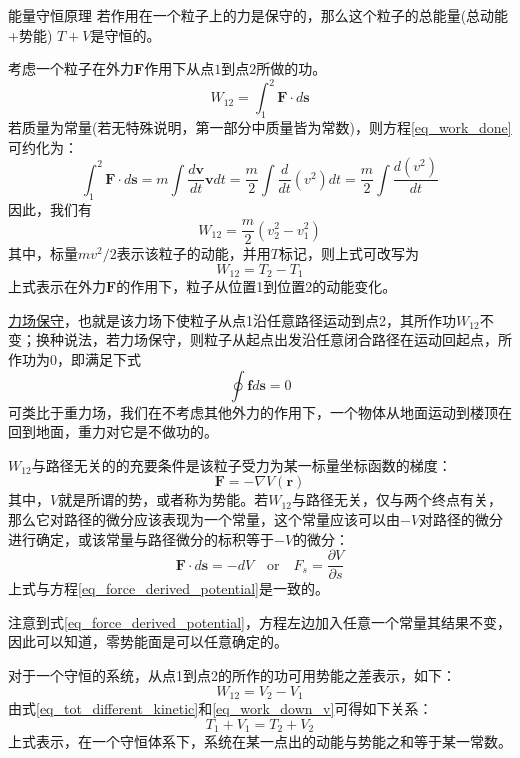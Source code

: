\vspace{5pt}
\begin{theorem}{能量守恒原理}
	若作用在一个粒子上的力是保守的，那么这个粒子的总能量(总动能+势能) $T+V$是守恒的。
\end{theorem}
考虑一个粒子在外力$\bm{F}$作用下从点$1$到点$2$所做的功。
\begin{equation}
	W_{12} = \int_{1}^{2} \bm{F} \cdot d\bm{s}	\label{eq_work_done}
\end{equation}
若质量为常量(若无特殊说明，第一部分中质量皆为常数)，则方程\eqref{eq_work_done}可约化为：
\begin{equation}
	\int_{1}^{2} \bm{F} \cdot d\bm{s} = m \int \frac{d\bm{v}}{dt}\bm{v} dt = \frac{m}{2} \int \frac{d}{dt}(v^2) dt = \frac{m}{2} \int \frac{d(v^2)}{dt} 
\end{equation}
因此，我们有
\begin{equation}
	W_{12} = \frac{m}{2}(v_2^2 - v_1^2)
\end{equation}
其中，标量$mv^2/2$表示该粒子的动能，并用$T$标记，则上式可改写为
\begin{equation}
	W_{12} = T_2 - T_1	\label{eq_tot_different_kinetic}
\end{equation} 
上式表示在外力$\bm{F}$的作用下，粒子从位置1到位置2的动能变化。
\begin{note}
	\underline{力场保守}，也就是该力场下使粒子从点1沿任意路径运动到点2，其所作功$W_{12}$不变；换种说法，若力场保守，则粒子从起点出发沿任意闭合路径在运动回起点，所作功为0，即满足下式
	\begin{equation}
		\oint \bm{f} d\bm{s} = 0	\label{eq_force_circuit_path}
	\end{equation} 
	可类比于重力场，我们在不考虑其他外力的作用下，一个物体从地面运动到楼顶在回到地面，重力对它是不做功的。
\end{note}
$W_{12}$与路径无关的的充要条件是该粒子受力为某一标量坐标函数的梯度：
\begin{equation}
	\bm{F} = - \nabla V(\bm{r})	\label{eq_force_derived_potential}
\end{equation} 
其中，$V$就是所谓的势，或者称为势能。若$W_{12}$与路径无关，仅与两个终点有关，那么它对路径的微分应该表现为一个常量，这个常量应该可以由$-V$对路径的微分进行确定，或该常量与路径微分的标积等于$-V$的微分：
\begin{equation*}
	\bm{F} \cdot d \bm{s} = -d V  \quad \text{or} \quad F_{s} = \frac{\partial V}{\partial s}
\end{equation*} 
上式与方程\eqref{eq_force_derived_potential}是一致的。
\begin{note}
	注意到式\eqref{eq_force_derived_potential}，方程左边加入任意一个常量其结果不变，因此可以知道，零势能面是可以任意确定的。
\end{note}
对于一个守恒的系统，从点1到点2的所作的功可用势能之差表示，如下：
\begin{equation}
	W_{12} = V_2 - V_1	\label{eq_work_down_v}
\end{equation} 
由式\eqref{eq_tot_different_kinetic}和\eqref{eq_work_down_v}可得如下关系：
\begin{equation}
	T_1 + V_1 = T_2 + V_2	\label{eq_energy_conservation}
\end{equation} 
上式表示，在一个守恒体系下，系统在某一点出的动能与势能之和等于某一常数。

